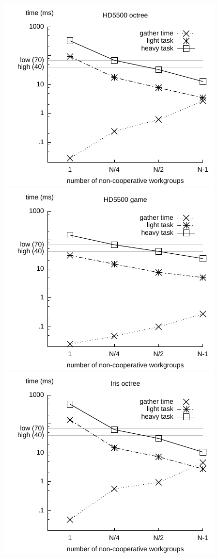 \documentclass[parskip=half,sigconf,review, anonymous=true, acmcopyrightmode=none]{acmart}
\begin{document}
\includegraphics[width=.7\columnwidth]{images/ws/hd5500_octree_NA.pdf} \\
\includegraphics[width=.7\columnwidth]{images/ws/hd5500_connect_four_NA.pdf} \\
\includegraphics[width=.7\columnwidth]{images/ws/iris_octree_NA.pdf} \\
\end{document}

